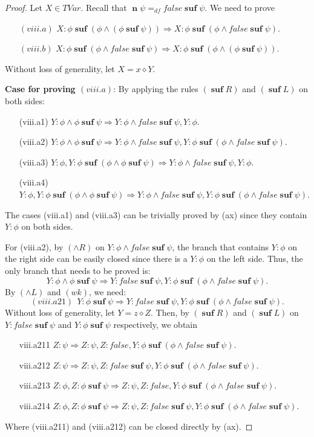 \documentclass[manuscript,screen]{acmart}
\newcommand{\dddef}[0]{=_{df}}
\newcommand{\false}[0]{\mathit{false}}
\newcommand{\cat}[0]{\diamond}
\DeclareMathOperator{\osuf}{\mathbf{suf}}
\newcommand{\TVar}[0]{\textit{TVar}}
\DeclareMathOperator{\nxt}{\mathbf{n}}
\begin{document}
\begin{proof}

Let $X\in \TVar$. 
Recall that $\nxt \psi \dddef \false\osuf \psi$.
We need to prove
\begin{enumerate}
\item[$(viii.a)$] $X : \phi\osuf(\phi\wedge(\phi\osuf\psi))\Rightarrow X : \phi\osuf(\phi\wedge \false\osuf \psi)$.
\item[$(viii.b)$] $X : \phi\osuf(\phi\wedge \false\osuf \psi)\Rightarrow X : \phi\osuf(\phi\wedge(\phi\osuf\psi))$.
\end{enumerate}
Without loss of generality, let $X = x\cat Y$.

\textbf{Case for proving $(viii.a)$}: 
By applying the rules $(\osuf R)$ and $(\osuf L)$ on both sides:
\begin{enumerate}
\item[(viii.a1)] $Y : \phi\wedge \phi\osuf\psi\Rightarrow Y : \phi\wedge \false\osuf\psi, Y : \phi$.
\item[(viii.a2)] $Y : \phi\wedge \phi\osuf\psi\Rightarrow Y : \phi\wedge \false\osuf\psi, Y : \phi\osuf(\phi\wedge \false\osuf\psi)$.
\item[(viii.a3)] $Y : \phi, Y : \phi\osuf(\phi\wedge \phi\osuf \psi)\Rightarrow Y : \phi\wedge \false\osuf\psi, Y : \phi$. 
\item[(viii.a4)] $Y : \phi, Y : \phi\osuf(\phi\wedge \phi\osuf \psi)\Rightarrow Y : \phi\wedge \false\osuf\psi, Y : \phi\osuf(\phi\wedge \false\osuf\psi)$. 
\end{enumerate}
The cases (viii.a1) and (viii.a3) can be trivially proved by (ax) since they contain $Y : \phi$ on both sides. 

For (viii.a2), by $(\wedge R)$ on $Y : \phi\wedge \false\osuf\psi$, the branch that contains $Y:\phi$ on the right side can be easily closed since there is a $Y:\phi$ on the left side. 
Thus, the only branch that needs to be proved is: 
$$
Y : \phi\wedge \phi\osuf \psi\Rightarrow Y : \false\osuf\psi, Y : \phi\osuf(\phi\wedge \false\osuf\psi). 
$$
By $(\wedge L)$ and $(wk)$, we need:
$$
(viii.a21)\ \ Y : \phi\osuf\psi\Rightarrow Y : \false\osuf\psi, Y : \phi\osuf(\phi\wedge \false\osuf\psi). 
$$
Without loss of generality, let $Y = z\cat Z$. 
Then, by $(\osuf R)$ and $(\osuf L)$ on $Y : \false\osuf\psi$ and $Y : \phi\osuf\psi$ respectively, we obtain
\begin{enumerate}
\item[viii.a211] $Z : \psi\Rightarrow Z : \psi, Z : \false, Y : \phi\osuf(\phi\wedge \false\osuf\psi)$. 
\item[viii.a212] $Z : \psi\Rightarrow Z : \psi, Z : \false\osuf \psi, Y : \phi\osuf(\phi\wedge \false\osuf\psi)$. 
\item[viii.a213]$Z : \phi, Z : \phi\osuf \psi\Rightarrow Z : \psi, Z : \false, Y : \phi\osuf(\phi\wedge \false\osuf\psi)$. 
\item[viii.a214]$Z : \phi, Z : \phi\osuf \psi\Rightarrow Z : \psi, Z : \false\osuf\psi, Y : \phi\osuf(\phi\wedge \false\osuf\psi)$. 
\end{enumerate}
Where (viii.a211) and (viii.a212) can be closed directly by (ax). 


\end{proof}
\end{document}
